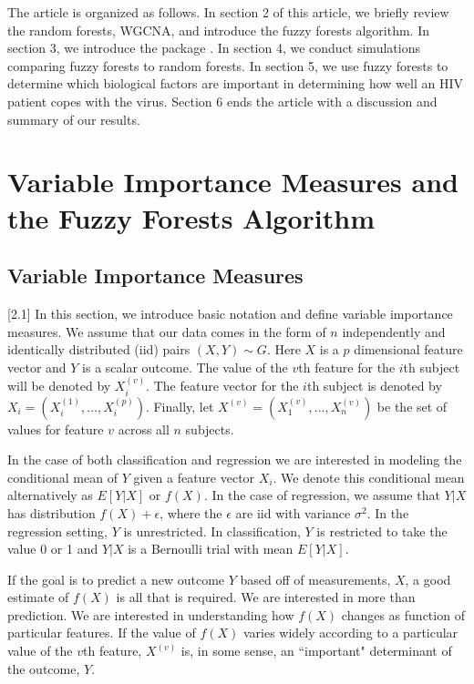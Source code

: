 \documentclass[article,shortnames]{jss}
\begin{document}
The article is organized as follows.  In section 2 of this article, we briefly review the random forests, WGCNA, and introduce the fuzzy forests algorithm.
In section 3, we introduce the  package .  In section 4, we conduct simulations comparing fuzzy forests to random forests.  In section 5, we use fuzzy forests to determine which biological factors are important in determining how well an HIV patient copes with the virus.  Section 6 ends the article with a discussion and summary of our results. 

\section{Variable Importance Measures and the Fuzzy Forests Algorithm}
\subsection{Variable Importance Measures}[2.1]
In this section, we introduce basic notation and define variable importance measures.  We assume that our data comes in the form of $n$ independently and identically distributed (iid)
pairs $(X,Y) \sim G$.  Here $X$ is a $p$ dimensional feature vector and $Y$ is a scalar outcome.  The value of the $v$th feature for the $i$th subject will be denoted by $X_{i}^{(v)}$.
The feature vector for the $i$th subject is denoted by $X_{i}=(X_{i}^{(1)},\ldots,X_{i}^{(p)})$.   Finally, let $X^{(v)}=(X_{1}^{(v)},\ldots,X_{n}^{(v)})$ be the set of values for feature $v$ across
all $n$ subjects.

In the case of both classification and regression we are interested in modeling the conditional mean of $Y$ given a feature vector $X_{i}$.  We denote this conditional mean alternatively as $E[Y|X]$ or $f(X)$.
In the case of regression, we assume that $Y|X$ has distribution $f(X) + \epsilon$, where the $\epsilon$ are iid with variance $\sigma^{2}$.   In the regression setting, $Y$ is unrestricted. 
In classification, $Y$ is restricted to take the value 0 or 1 and $Y|X$ is a Bernoulli trial with mean $E[Y|X]$.  

If the goal is to predict a new outcome $Y$ based off of measurements, $X$, a good estimate of $f(X)$ is all that is required.
We are interested in more than prediction.  We are interested in understanding how $f(X)$ changes as function of particular features. 
If the value of $f(X)$ varies widely according to a particular value of the $v$th feature, $X^{(v)}$ is, in some sense, an ``important" determinant of
the outcome, $Y$.  
\end{document}

